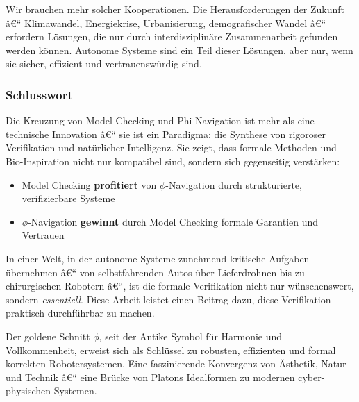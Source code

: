 ﻿\documentclass[a4paper,12pt]{article}
\theoremstyle{definition}
\begin{document}
Wir brauchen mehr solcher Kooperationen. Die Herausforderungen der Zukunft â€“ Klimawandel, Energiekrise, Urbanisierung, demografischer Wandel â€“ erfordern Lösungen, die nur durch interdisziplinäre Zusammenarbeit gefunden werden können. Autonome Systeme sind ein Teil dieser Lösungen, aber nur, wenn sie sicher, effizient und vertrauenswürdig sind.

\subsubsection{Schlusswort}

Die Kreuzung von Model Checking und Phi-Navigation ist mehr als eine technische Innovation â€“ sie ist ein Paradigma: die Synthese von rigoroser Verifikation und natürlicher Intelligenz. Sie zeigt, dass formale Methoden und Bio-Inspiration nicht nur kompatibel sind, sondern sich gegenseitig verstärken:

\begin{itemize}
	\item Model Checking \textbf{profitiert} von $\phi$-Navigation durch strukturierte, verifizierbare Systeme
	\item $\phi$-Navigation \textbf{gewinnt} durch Model Checking formale Garantien und Vertrauen
\end{itemize}

In einer Welt, in der autonome Systeme zunehmend kritische Aufgaben übernehmen â€“ von selbstfahrenden Autos über Lieferdrohnen bis zu chirurgischen Robotern â€“, ist die formale Verifikation nicht nur wünschenswert, sondern \textit{essentiell}. Diese Arbeit leistet einen Beitrag dazu, diese Verifikation praktisch durchführbar zu machen.

Der goldene Schnitt $\phi$, seit der Antike Symbol für Harmonie und Vollkommenheit, erweist sich als Schlüssel zu robusten, effizienten und formal korrekten Robotersystemen. Eine faszinierende Konvergenz von Ästhetik, Natur und Technik â€“ eine Brücke von Platons Idealformen zu modernen cyber-physischen Systemen.
\end{document}
